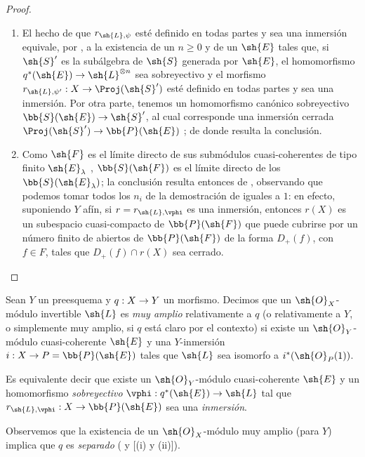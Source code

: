 \documentclass[oneside,10pt]{amsart}
\makeatletter
\renewcommand{\geq}{\geqslant}
\newcommand{\ega@arrow}[2]{\mathchoice{#1}{#2}{#2}{#2}}
\renewcommand{\to}{\ega@arrow{\longrightarrow}{\rightarrow}}
\let\EGAOriginalLabel\label
\renewcommand{\label}[1]{\phantomsection\EGAOriginalLabel{#1}}
\makeatother
\begin{document}
\begin{proof}
\medskip\noindent
\begin{enumerate}
  \item[\rm{(i)}] El hecho de que $r_{\sh{L},\psi}$ esté definido en todas partes y sea una inmersión equivale, por , a la existencia de un $n\geq0$ y de un $\sh{E}$ tales que, si $\sh{S}'$ es la subálgebra de $\sh{S}$ generada por $\sh{E}$, el homomorfismo $q^*(\sh{E})\to\sh{L}^{\otimes n}$ sea sobreyectivo y el morfismo $r_{\sh{L},\psi'}:X\to\Proj(\sh{S}')$ esté definido en todas partes y sea una inmersión.
    Por otra parte, tenemos un homomorfismo canónico sobreyectivo $\bb{S}(\sh{E})\to\sh{S}'$, al cual corresponde una inmersión cerrada $\Proj(\sh{S}')\to\bb{P}(\sh{E})$ ;
    de donde resulta la conclusión.
  \item[\rm{(ii)}] Como $\sh{F}$ es el límite directo de sus submódulos cuasi-coherentes de tipo finito $\sh{E}_\lambda$ , $\bb{S}(\sh{F})$ es el límite directo de los $\bb{S}(\sh{E}_\lambda)$;
    la conclusión resulta entonces de , observando que podemos tomar todos los $n_i$ de la demostración de  iguales a $1$:
    en efecto, suponiendo $Y$ afín, si $r=r_{\sh{L},\vphi}$ es una inmersión, entonces $r(X)$ es un subespacio cuasi-compacto de $\bb{P}(\sh{F})$ que puede cubrirse por un número finito de abiertos de $\bb{P}(\sh{F})$ de la forma $D_+(f)$, con $f\in F$, tales que $D_+(f)\cap r(X)$ sea cerrado.
\end{enumerate}
\end{proof}

\begin{definition}[4.4.2]
\label{II.4.4.2}
Sean $Y$ un preesquema y $q:X\to Y$ un morfismo.
Decimos que un $\sh{O}_X$-módulo invertible $\sh{L}$ es \emph{muy amplio} relativamente a $q$ \textup{(o} relativamente a $Y$\textup{, o simplemente} muy amplio\textup{, si $q$ está claro por el contexto)} si existe un $\sh{O}_Y$-módulo cuasi-coherente $\sh{E}$ y una $Y$-inmersión $i:X\to P=\bb{P}(\sh{E})$ tales que $\sh{L}$ sea isomorfo a $i^*(\sh{O}_P(1))$.
\end{definition}

Es equivalente  decir que existe un $\sh{O}_Y$-módulo cuasi-coherente $\sh{E}$ y un homomorfismo \emph{sobreyectivo} $\vphi:q^*(\sh{E})\to\sh{L}$ tal que $r_{\sh{L},\vphi}:X\to\bb{P}(\sh{E})$ sea una \emph{inmersión}.

Observemos que la existencia de un $\sh{O}_X$-módulo muy amplio (para $Y$) implica que $q$ es \emph{separado} ( y [(i) y (ii)]).
\end{document}
